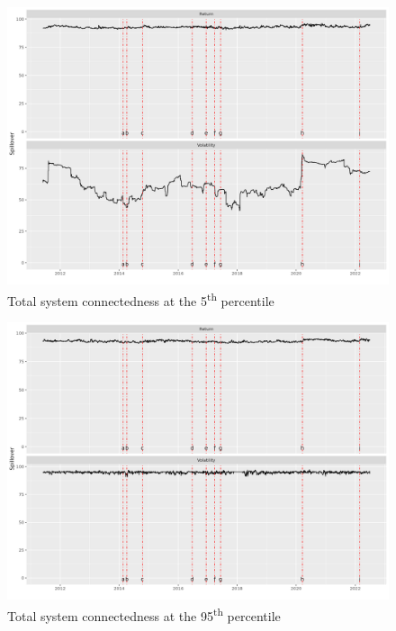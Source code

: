 \documentclass[
  letterpaper,
  DIV=11,
  numbers=noendperiod]{scrartcl}
\begin{document}
\begin{figure}[H]

{\centering \includegraphics{plots/fig-TCI5.png}

}

\caption{\label{fig-TCI5}Total system connectedness at the
5\textsuperscript{th} percentile}

\end{figure}

\begin{figure}[H]

{\centering \includegraphics{plots/fig-TCI95.png}

}

\caption{\label{fig-TCI95}Total system connectedness at the
95\textsuperscript{th} percentile}

\end{figure}
\end{document}
